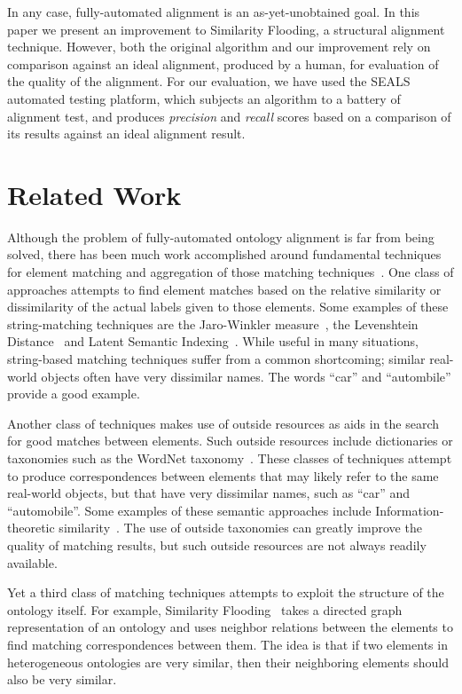 \documentclass[letterpaper,twocolumn,12pt]{article}
\begin{document}
In any case, fully-automated alignment is an as-yet-unobtained goal. 
In this paper we present an improvement to Similarity Flooding, a structural alignment technique. 
However, both the original algorithm and our improvement rely on comparison against an ideal alignment, produced by a human, for evaluation of the quality of the alignment. 
For our evaluation, we have used the SEALS automated testing platform, which subjects an algorithm to a battery of alignment test, and produces \textit{precision} and \textit{recall} scores based on a comparison of its results against an ideal alignment result.

\section{Related Work}

Although the problem of fully-automated ontology alignment is far from being solved, there has been much work accomplished around fundamental techniques for element matching and aggregation of those matching techniques~\cite{euzenat:2007:ontology}.
One class of approaches attempts to find element matches based on the relative similarity or dissimilarity of the actual labels given to those elements. 
Some examples of these string-matching techniques are the Jaro-Winkler measure~\cite{winkler:1999:state}, the Levenshtein Distance~\cite{yujian:2007:levenshtein} and Latent Semantic Indexing~\cite{benzecri:1973:lsi}.
%
While useful in many situations, string-based matching techniques suffer from a common shortcoming; similar real-world objects often have very dissimilar names. 
The words ``car'' and ``autombile'' provide a good example.

Another class of techniques makes use of outside resources as aids in the search for good matches between elements. 
Such outside resources include dictionaries or taxonomies such as the WordNet taxonomy~\cite{miller:1995:wordnet}. 
These classes of techniques attempt to produce correspondences between elements that may likely refer to the same real-world objects, but that have very dissimilar names, such as ``car'' and ``automobile''. 
Some examples of these semantic approaches include Information-theoretic similarity~\cite{lin:1998:information}.
%
The use of outside taxonomies can greatly improve the quality of matching results, but such outside resources are not always readily available.

Yet a third class of matching techniques attempts to exploit the structure of the ontology itself. 
For example, Similarity Flooding~\cite{melnik:2002:similarity} takes a directed graph representation of an ontology and uses neighbor relations between the elements to find matching correspondences between them. 
The idea is that if two elements in heterogeneous ontologies are very similar, then their neighboring elements should also be very similar.
\end{document}
